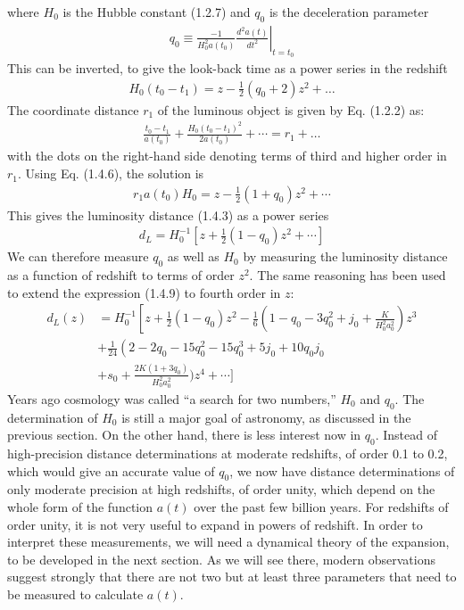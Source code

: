 \documentclass[11pt]{ltjsarticle}
\theoremstyle{plain}
\theoremstyle{break}
\begin{document}
where $H_0$ is the Hubble constant (1.2.7) and $q_0$ is the deceleration parameter
\begin{align}
  q_{0} \equiv \frac{-1}{H_{0}^{2} a\left(t_{0}\right)}\left.\frac{d^{2} a(t)}{d t^{2}}\right|_{t=t_{0}}
\end{align}
This can be inverted, to give the look-back time as a power series in the redshift
\begin{align}
  H_{0}\left(t_{0}-t_{1}\right)=z-\frac{1}{2}\left(q_{0}+2\right) z^{2}+\ldots
\end{align}
The coordinate distance $r_1$ of the luminous object is given by Eq. (1.2.2) as:
\begin{align}
  \frac{t_{0}-t_{1}}{a\left(t_{0}\right)}+\frac{H_{0}\left(t_{0}-t_{1}\right)^{2}}{2 a\left(t_{0}\right)}+\cdots=r_{1}+\ldots
\end{align}
with the dots on the right-hand side denoting terms of third and higher order
in $r_1$. Using Eq. (1.4.6), the solution is
\begin{align}
  r_{1} a\left(t_{0}\right) H_{0}=z-\frac{1}{2}\left(1+q_{0}\right) z^{2}+\cdots
\end{align}
This gives the luminosity distance (1.4.3) as a power series
\begin{align}
  d_{L}=H_{0}^{-1}\left[z+\frac{1}{2}\left(1-q_{0}\right) z^{2}+\cdots\right]
\end{align}
We can therefore measure $q_0$ as well as $H_0$ by measuring the luminosity distance as a function of redshift to terms of order $z^2$.
The same reasoning has been used to extend the expression (1.4.9) to fourth order in $z$:
\begin{align}
  d_{L}(z)
  & =H_{0}^{-1}\left[z+\frac{1}{2}\left(1-q_{0}\right) z^{2}-\frac{1}{6}\left(1-q_{0}-3 q_{0}^{2}+j_{0}+\frac{K}{H_{0}^{2} a_{0}^{2}}\right) z^{3}\right. \\
  & +\frac{1}{24}\left(2-2 q_{0}-15 q_{0}^{2}-15 q_{0}^{3}+5 j_{0}+10 q_{0} j_{0}\right.\\
  &+s_{0}+\frac{2 K\left(1+3 q_{0}\right)}{H_{0}^{2} a_{0}^{2}} ) z^{4}+\cdots ]
\end{align}
Years ago cosmology was called “a search for two numbers,” $H_0$ and $q_0$. The determination of $H_0$ is still a major goal of astronomy, as discussed in the previous section. On the other hand, there is less interest now in $q_0$.
Instead of high-precision distance determinations at moderate redshifts, of order 0.1 to 0.2, which would give an accurate value of $q_0$, we now have distance determinations of only moderate precision at high redshifts, of order unity, which depend on the whole form of the function $a(t)$ over the past few billion years.
For redshifts of order unity, it is not very useful to expand in powers of redshift.
In order to interpret these measurements, we will need a dynamical theory of the expansion, to be developed in the next section. As we will see there, modern observations suggest strongly that there are not two but at least three parameters that need to be measured to calculate $a(t)$.
\end{document}

